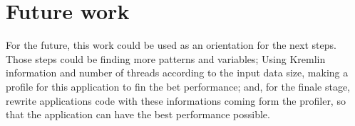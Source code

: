 \section{Future work}

For the future, this work could be used as an orientation for the next steps. Those steps could be finding more patterns and variables; Using Kremlin information and number of threads according to the input data size, making a profile for this application to fin the bet performance; and, for the finale stage, rewrite applications code with these informations coming form the profiler, so that the application can have the best performance possible.




